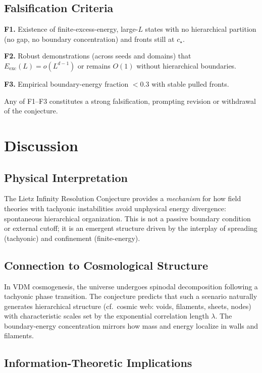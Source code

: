 \documentclass{article}
\begin{document}
\subsection{Falsification Criteria}

\textbf{F1.} Existence of finite-excess-energy, large-$L$ states with no hierarchical partition (no gap, no boundary concentration) and fronts still at $c_\star$.

\textbf{F2.} Robust demonstrations (across seeds and domains) that $E_{\text{exc}}(L)=o(L^{d-1})$ or remains $O(1)$ without hierarchical boundaries.

\textbf{F3.} Empirical boundary-energy fraction $<0.3$ with stable pulled fronts.

Any of F1--F3 constitutes a strong falsification, prompting revision or withdrawal of the conjecture.

\section{Discussion}
\label{sec:discussion}

\subsection{Physical Interpretation}

The Lietz Infinity Resolution Conjecture provides a \emph{mechanism} for how field theories with tachyonic instabilities avoid unphysical energy divergence: spontaneous hierarchical organization. This is not a passive boundary condition or external cutoff; it is an emergent structure driven by the interplay of spreading (tachyonic) and confinement (finite-energy).

\subsection{Connection to Cosmological Structure}

In VDM cosmogenesis, the universe undergoes spinodal decomposition following a tachyonic phase transition. The conjecture predicts that such a scenario naturally generates hierarchical structure (cf.\ cosmic web: voids, filaments, sheets, nodes) with characteristic scales set by the exponential correlation length $\lambda$. The boundary-energy concentration mirrors how mass and energy localize in walls and filaments.

\subsection{Information-Theoretic Implications}
\end{document}
